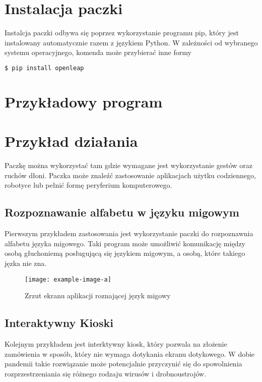\section{Instalacja paczki}
\quad Instalcja paczki odbywa się poprzez wykorzystanie programu pip, który jest instalowany automatycznie razem z językiem Python. W zależności od wybranego systemu operacyjnego, komenda może przybierać inne formy 

\begin{lstlisting}[language=bash]
    $ pip install openleap
\end{lstlisting}

\section{Przykładowy program}

\section{Przykład działania}
\quad Paczkę można wykorzystać tam gdzie wymagane jest wykorzystanie gestów oraz ruchów dłoni. Paczka może znaleźć zastosowanie aplikacjach użytku codziennego, robotyce lub pełnić formę peryferium komputerowego.  

\subsection{Rozpoznawanie alfabetu w języku migowym}
\quad Pierwszym przykładem zastosowania jest wykorzystanie paczki do rozpoznawnia alfabetu języka migowego. Taki program może umożliwić komunikację między osobą głuchoniemą posługującą się językiem migowym, a osobą, które takiego jęzka nie zna. 

\begin{figure}[H]
    \begin{center}
        \texttt{[image: example-image-a]}
        \caption{Zrzut ekranu aplikacji roznającej język migowy}
    \end{center}
\end{figure}

\subsection{Interaktywny Kioski}
\quad Kolejnym przykładem jest interktywny kiosk, który pozwala na złożenie zamówienia w sposób, który nie wymaga dotykania ekranu dotykowego. W dobie pandemii takie rozwiązanie może potencjalnie przyczynić się do spowolnienia rozprzestrzeniania się różnego rodzaju wirusów i drobnoustrojów. 


